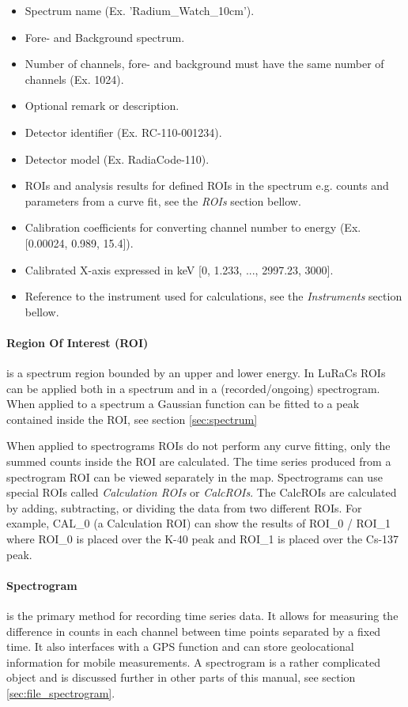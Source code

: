 \begin{itemize}
    \item Spectrum name (Ex. 'Radium\_Watch\_10cm').
    \item Fore- and Background spectrum.
    \item Number of channels, fore- and background must have the same number of channels (Ex. 1024).
    \item Optional remark or description.
    \item Detector identifier (Ex. RC-110-001234).
    \item Detector model (Ex. RadiaCode-110).
    \item ROIs and analysis results for defined ROIs in the spectrum e.g. counts and parameters from a curve fit, see the \textit{ROIs} section bellow.
    \item Calibration coefficients for converting channel number to energy (Ex. [0.00024, 0.989, 15.4]).
    \item Calibrated X-axis expressed in keV [0, 1.233, ..., 2997.23, 3000].
    \item Reference to the instrument used for calculations, see the \textit{Instruments} section bellow.
\end{itemize}



\paragraph{Region Of Interest (ROI)} is a spectrum region bounded by an upper and lower energy. In LuRaCs ROIs can be applied both in a spectrum and in a (recorded/ongoing) spectrogram. When applied to a spectrum a Gaussian function can be fitted to a peak contained inside the ROI, see section \ref{sec:spectrum}

When applied to spectrograms ROIs do not perform any curve fitting, only the summed counts inside the ROI are calculated. The time series produced from a spectrogram ROI can be viewed separately in the map. Spectrograms can use special ROIs called \textit{Calculation ROIs} or \textit{CalcROIs}. The CalcROIs are calculated by adding, subtracting, or dividing the data from two different ROIs. For example, CAL\_0 (a Calculation ROI) can show the results of ROI\_0 / ROI\_1 where ROI\_0 is placed over the K-40 peak and ROI\_1 is placed over the Cs-137 peak.

\paragraph{Spectrogram} is the primary method for recording time series data. It allows for measuring the difference in counts in each channel between time points separated by a fixed time. It also interfaces with a GPS function and can store geolocational information for mobile measurements. A spectrogram is a rather complicated object and is discussed further in other parts of this manual, see section \ref{sec:file_spectrogram}.

